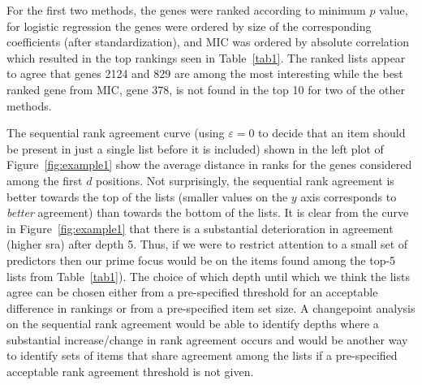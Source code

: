 \documentclass[oupdraft]{bio}
\makeatletter
\newcommand{\ie}{\emph{i.e.}\@\xspace}
\newcommand{\added}[1]{{\color{added}{}#1}}
\makeatother
\begin{document}
\added{
For the first two methods, the genes were ranked according to minimum
$p$ value, for logistic regression the genes were ordered by size of
the corresponding coefficients (after standardization), and MIC was
ordered by absolute correlation which resulted in the top rankings
seen in Table~\ref{tab1}. The ranked lists appear to agree that genes
2124 and 829 are among the most interesting while the best ranked
gene from MIC, gene 378, is not found in the top 10 for two of the
other methods.







The sequential rank agreement curve (using $\varepsilon=0$ to decide
that an item should be present in just a single list before it is
included) shown in the left plot of Figure~\ref{fig:example1} show the
average distance in ranks for the genes considered among the first $d$
positions. Not surprisingly, the sequential rank agreement is better
towards the top of the lists (smaller values on the $y$ axis
corresponds to \emph{better} agreement) than towards the bottom of the
lists. It is clear from the curve in Figure~\ref{fig:example1} that
there is a substantial deterioration in agreement (higher sra) after
depth 5. Thus, if we were to restrict attention to a small set of
predictors then our prime focus would be on the items found among the
top-5 lists from Table~\ref{tab1}). The choice of which depth until
which we think the lists agree can be chosen either from a
pre-specified threshold for an acceptable difference in rankings or
from a pre-specified item set size. A changepoint analysis on the
sequential rank agreement would be able to identify depths where a
substantial increase/change in rank agreement occurs and would be
another way to identify sets of items that share agreement among the
lists if a pre-specified acceptable rank agreement threshold is not
given.}
\end{document}
